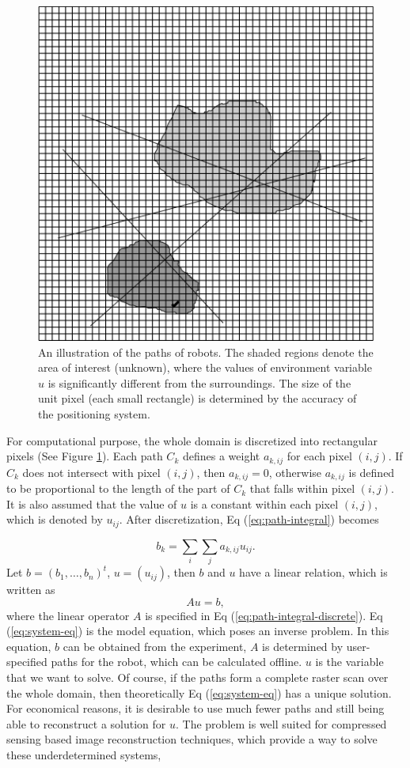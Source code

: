 \documentclass[english]{article}\usepackage[]{graphicx}\usepackage[]{color}
\begin{document}
\begin{figure}[h]
\begin{centering}

\includegraphics[width=0.5\linewidth]{figures/path-illustration}
\par\end{centering}

\caption{\label{fig:An-illustration-of-paths}An illustration of the paths
of robots. The shaded regions denote the area of interest (unknown),
where the values of environment variable $u$ is significantly different
from the surroundings. The size of the unit pixel (each small rectangle)
is determined by the accuracy of the positioning system.}
\end{figure}


For computational purpose, the whole domain is discretized into rectangular
pixels (See Figure \ref{fig:An-illustration-of-paths}). Each path
$C_{k}$ defines a weight $a_{k,ij}$ for each pixel $(i,j)$. If
$C_{k}$ does not intersect with pixel $(i,j)$, then $a_{k,ij}=0$,
otherwise $a_{k,ij}$ is defined to be proportional to the length
of the part of $C_{k}$ that falls within pixel $(i,j)$. It is also
assumed that the value of $u$ is a constant within each pixel $(i,j)$,
which is denoted by $u_{ij}$. After discretization, Eq (\ref{eq:path-integral})
becomes

\begin{equation}
b_{k}=\sum_{i}\sum_{j}a_{k,ij}u_{ij}.\label{eq:path-integral-discrete}
\end{equation}
Let $b=(b_{1},\ldots,b_{n})^{t}$, $u=(u_{ij})$, then $b$ and $u$
have a linear relation, which is written as 
\begin{equation}
Au=b,\label{eq:system-eq}
\end{equation}
where the linear operator $A$ is specified in Eq (\ref{eq:path-integral-discrete}).
Eq (\ref{eq:system-eq}) is the model equation, which poses an inverse
problem. In this equation, $b$ can be obtained from the experiment,
$A$ is determined by user-specified paths for the robot, which can
be calculated offline. $u$ is the variable that we want to solve.
Of course, if the paths form a complete raster scan over the whole
domain, then theoretically Eq (\ref{eq:system-eq}) has a unique solution.
For economical reasons, it is desirable to use much fewer paths and
still being able to reconstruct a solution for $u$. The problem is well suited for compressed sensing based image reconstruction techniques, which provide a way to solve these underdetermined systems, 
\end{document}
